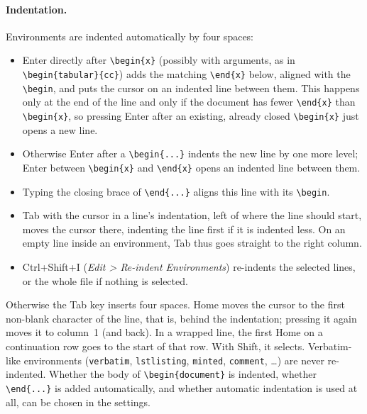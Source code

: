 \documentclass[11pt]{article}
\newcommand{\key}[1]{\textsf{#1}}
\newcommand{\menu}[1]{\textsf{\textit{#1}}}
\begin{document}
    \paragraph{Indentation.}     Environments are indented automatically by four spaces:
    \begin{itemize}
        \itemsep-1mm
        \item \key{Enter} directly after \verb+\begin{x}+ (possibly with arguments, as in \verb+\begin{tabular}{cc}+) adds the matching \verb+\end{x}+ below, aligned with the \verb+\begin+, and puts the cursor on an indented line between them. This happens only at the end of the line and only if the document has fewer \verb+\end{x}+ than \verb+\begin{x}+, so pressing \key{Enter} after an existing, already closed \verb+\begin{x}+ just opens a new line.
        \item Otherwise \key{Enter} after a \verb+\begin{...}+ indents the new line by one more level; \key{Enter} between \verb+\begin{x}+ and \verb+\end{x}+ opens an indented line between them.
        \item Typing the closing brace of \verb+\end{...}+ aligns this line with its \verb+\begin+.
        \item \key{Tab} with the cursor in a line's indentation, left of where the line should start, moves the cursor there, indenting the line first if it is indented less. On an empty line inside an environment, \key{Tab} thus goes straight to the right column.
        \item \key{Ctrl+Shift+I} (\menu{Edit > Re-indent Environments}) re-indents the selected lines, or the whole file if nothing is selected.
    \end{itemize}
    Otherwise the \key{Tab} key inserts four spaces. \key{Home} moves the cursor to the first non-blank character of the line, that is, behind the indentation; pressing it again moves it to column~1 (and back). In a wrapped line, the first \key{Home} on a continuation row goes to the start of that row. With \key{Shift}, it selects. Verbatim-like environments (\verb+verbatim+, \verb+lstlisting+, \verb+minted+, \verb+comment+, \ldots) are never re-indented. Whether the body of \verb+\begin{document}+ is indented, whether \verb+\end{...}+ is added automatically, and whether automatic indentation is used at all, can be chosen in the settings.
\end{document}
